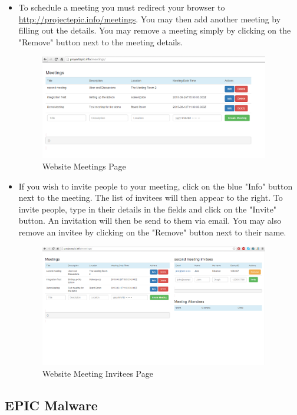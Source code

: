 \documentclass{article}
\begin{document}
\begin{itemize}
        \item {To schedule a meeting you must redirect your browser to \url{http://projectepic.info/meetings}. You may then add another meeting by filling out the details. You may remove a meeting simply by clicking on the "Remove" button next to the meeting details. 
        \begin{figure}[H]
                \centering
                \includegraphics[width=10cm]{webPics/meetings}
                \caption{Website Meetings Page}
                \label{fig}
            \end{figure}}
            
            \item {If you wish to invite people to your meeting, click on the blue "Info" button next to the meeting. The list of invitees will then appear to the right. To invite people, type in their details in the fields and click on the "Invite" button. An invitation will then be send to them via email. You may also remove an invitee by clicking on the "Remove" button next to their name. 
          \begin{figure}[H]
                \centering
                \includegraphics[width=10cm]{webPics/meetinginfo}
                \caption{Website Meeting Invitees Page}
                \label{fig}
            \end{figure}}          
            

\end{itemize}


\subsection{EPIC Malware}
\end{document}
